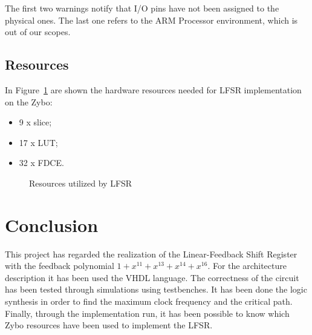 \documentclass[11pt,a4paper,oneside, openright]{article}
\begin{document}
The first two warnings notify that I/O pins have not been assigned to the physical ones. The last one refers to the ARM Processor environment, which is out of our scopes.

\subsection{Resources}
In Figure~\ref{fig:resources} are shown the hardware resources needed for LFSR implementation on the Zybo:

\begin{itemize}
    \item 9 x slice;
    \item 17 x LUT;
    \item 32 x FDCE.
\end{itemize}

\begin{figure}[h]
    \centering
    \hfill
    \caption{Resources utilized by LFSR}
    \label{fig:resources}
\end{figure}

\section{Conclusion}
This project has regarded the realization of the Linear-Feedback Shift Register with the feedback polynomial $ 1 + x^{11} + x^{13} + x^{14} + x^{16} $. For the architecture description it has been used the VHDL language. The correctness of the circuit has been tested through simulations using testbenches. It has been done the logic synthesis in order to find the maximum clock frequency and the critical path. Finally, through the implementation run, it has been possible to know which Zybo resources have been used to implement the LFSR.

\newpage

\begin{appendix}
    \listoffigures
    \lstlistoflistings
\end{appendix}

 

\end{document}
